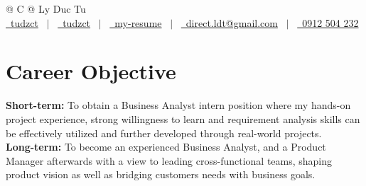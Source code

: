 \documentclass[a4paper,12pt]{article}
\begin{document}
\pagestyle{empty} 



\begin{tabularx}{\linewidth}{@{} C @{}}
\Huge{Ly Duc Tu} \\[7.5pt]
\href{https://github.com/tudzct}{\raisebox{-0.05\height}\faGithub\ tudzct} \ $|$ \ 
\href{https://linkedin.com/in/tudzct}{\raisebox{-0.05\height}\faLinkedin\ tudzct} \ $|$ \ 
\href{https://tudzct.github.io/my-resume/}{\raisebox{-0.05\height}\faGlobe \ my-resume} \ $|$ \ 
\href{mailto:direct.ldt@gmail.com}{\raisebox{-0.05\height}\faEnvelope \ direct.ldt@gmail.com} \ $|$ \ 
\href{tel:+84912504232}{\raisebox{-0.05\height}\faMobile \ 0912 504 232} \\
\end{tabularx}


\section{Career Objective}
\textbf{Short-term:} To obtain a Business Analyst intern position where my hands-on project experience, strong willingness to learn and requirement analysis skills can be effectively utilized and further developed through real-world projects. \\
\textbf{Long-term:} To become an experienced Business Analyst, and a Product Manager afterwards with a view to leading cross-functional teams, shaping product vision as well as bridging customers needs with business goals.
\end{document}
